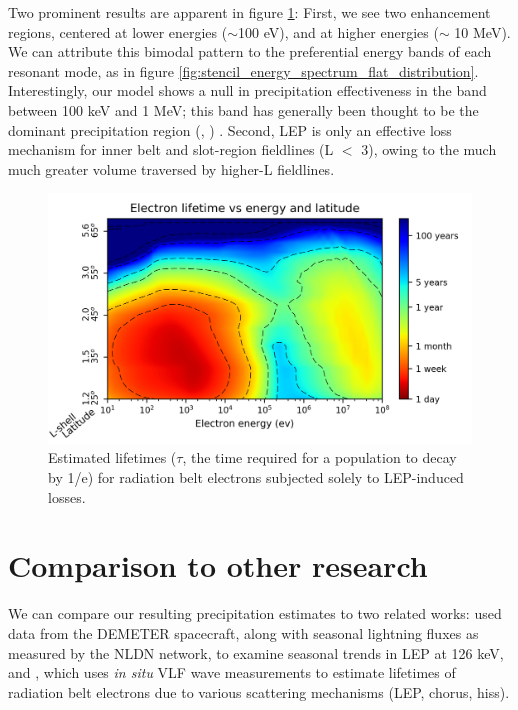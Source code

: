 Two prominent results are apparent in figure \ref{fig:electron_lifetimes}: First, we see two enhancement regions, centered at lower energies ($\sim$100 eV), and at higher energies ($\sim$ 10 MeV). We can attribute this bimodal pattern to the preferential energy bands of each resonant mode, as in figure \ref{fig:stencil_energy_spectrum_flat_distribution}. Interestingly, our model shows a null in precipitation effectiveness in the band between 100 keV and 1 MeV; this band has generally been thought to be the dominant precipitation region (\cite{Voss1984}, \cite{Voss1998}) . Second, LEP is only an effective loss mechanism for inner belt and slot-region fieldlines (L $<$ 3), owing to the much much greater volume traversed by higher-L fieldlines.
\begin{figure}[t]
\begin{center}
\includegraphics{figures/electron_lifetimes_updated_power.png}
\caption[Estimated lifetime of radiation belt electrons subject to LEP losses only]{Estimated lifetimes ($\tau$, the time required for a population to decay by 1/e) for radiation belt electrons subjected solely to LEP-induced losses.}
\label{fig:electron_lifetimes}
\end{center}
\end{figure}


\section{Comparison to other research}
We can compare our resulting precipitation estimates to two related works: \cite{Gemelos2009} used data from the DEMETER spacecraft, along with seasonal lightning fluxes as measured by the NLDN network, to examine seasonal trends in LEP at 126 keV, and \cite{Meredith2007}, which uses \emph{in situ} VLF wave measurements to estimate lifetimes of radiation belt electrons due to various scattering mechanisms (LEP, chorus, hiss).

